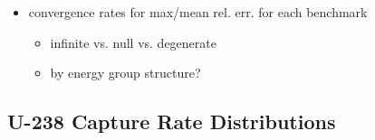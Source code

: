 \begin{itemize}[noitemsep]
  \item convergence rates for max/mean rel. err. for each benchmark
  \begin{itemize}[noitemsep]
    \item infinite vs. null vs. degenerate
    \item by energy group structure?
  \end{itemize}
\end{itemize}

\subsection{U-238 Capture Rate Distributions}
\label{subsec:chap8-capt-rates}

